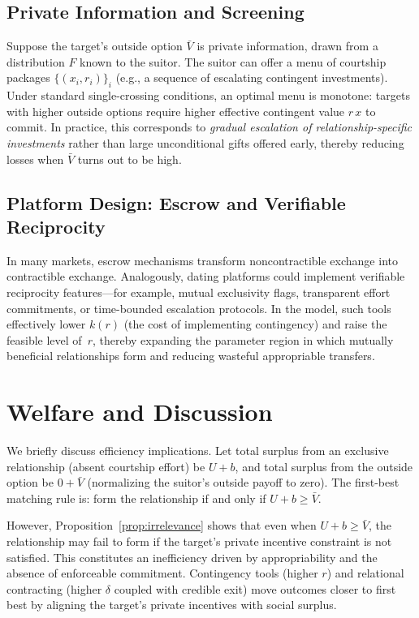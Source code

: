 \documentclass[AER]{AEA}
\begin{document}
\subsection{Private Information and Screening}

Suppose the target's outside option $\bar{V}$ is private information, drawn from a distribution $F$ known to the suitor.
The suitor can offer a menu of courtship packages $\{(x_i,r_i)\}_{i}$ (e.g., a sequence of escalating contingent investments).
Under standard single-crossing conditions, an optimal menu is monotone: targets with higher outside options require higher effective contingent value $r\,x$ to commit.
In practice, this corresponds to \emph{gradual escalation of relationship-specific investments} rather than large unconditional gifts offered early, thereby reducing losses when $\bar{V}$ turns out to be high.

\subsection{Platform Design: Escrow and Verifiable Reciprocity}

In many markets, escrow mechanisms transform noncontractible exchange into contractible exchange.
Analogously, dating platforms could implement verifiable reciprocity features---for example, mutual exclusivity flags, transparent effort commitments, or time-bounded escalation protocols.
In the model, such tools effectively lower $k(r)$ (the cost of implementing contingency) and raise the feasible level of~$r$, thereby expanding the parameter region in which mutually beneficial relationships form and reducing wasteful appropriable transfers.

\section{Welfare and Discussion}

We briefly discuss efficiency implications.
Let total surplus from an exclusive relationship (absent courtship effort) be $U+b$, and total surplus from the outside option be $0+\bar{V}$ (normalizing the suitor's outside payoff to zero).
The first-best matching rule is: form the relationship if and only if $U+b \ge \bar{V}$.

However, Proposition~\ref{prop:irrelevance} shows that even when $U+b \ge \bar{V}$, the relationship may fail to form if the target's private incentive constraint is not satisfied.
This constitutes an inefficiency driven by appropriability and the absence of enforceable commitment.
Contingency tools (higher $r$) and relational contracting (higher $\delta$ coupled with credible exit) move outcomes closer to first best by aligning the target's private incentives with social surplus.
\end{document}

